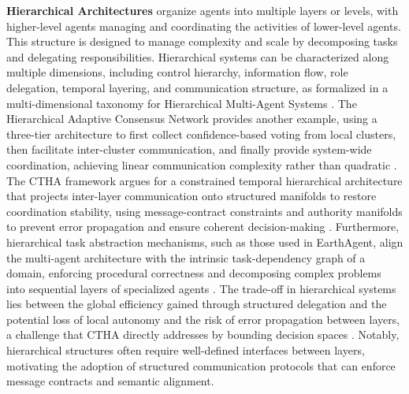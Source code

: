 \documentclass[11pt]{article}
\begin{document}
\textbf{Hierarchical Architectures} organize agents into multiple layers or levels, with higher-level agents managing and coordinating the activities of lower-level agents. This structure is designed to manage complexity and scale by decomposing tasks and delegating responsibilities. Hierarchical systems can be characterized along multiple dimensions, including control hierarchy, information flow, role delegation, temporal layering, and communication structure, as formalized in a multi-dimensional taxonomy for Hierarchical Multi-Agent Systems \cite{ref46}. The Hierarchical Adaptive Consensus Network provides another example, using a three-tier architecture to first collect confidence-based voting from local clusters, then facilitate inter-cluster communication, and finally provide system-wide coordination, achieving linear communication complexity rather than quadratic \cite{ref51}. The CTHA framework argues for a constrained temporal hierarchical architecture that projects inter-layer communication onto structured manifolds to restore coordination stability, using message-contract constraints and authority manifolds to prevent error propagation and ensure coherent decision-making \cite{ref56}. Furthermore, hierarchical task abstraction mechanisms, such as those used in EarthAgent, align the multi-agent architecture with the intrinsic task-dependency graph of a domain, enforcing procedural correctness and decomposing complex problems into sequential layers of specialized agents \cite{ref57}. The trade-off in hierarchical systems lies between the global efficiency gained through structured delegation and the potential loss of local autonomy and the risk of error propagation between layers, a challenge that CTHA directly addresses by bounding decision spaces \cite{ref56}. Notably, hierarchical structures often require well-defined interfaces between layers, motivating the adoption of structured communication protocols that can enforce message contracts and semantic alignment.
\end{document}
